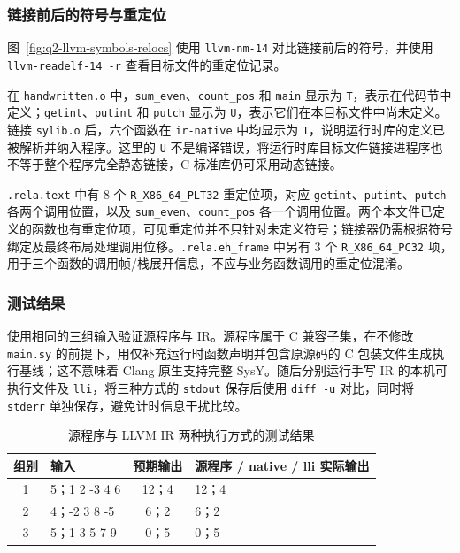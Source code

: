 
\subsubsection{链接前后的符号与重定位}

图~\ref{fig:q2-llvm-symbols-relocs} 使用 \texttt{llvm-nm-14} 对比链接前后的符号，并使用 \texttt{llvm-readelf-14 -r} 查看目标文件的重定位记录。


\begin{samepage}
在 \texttt{handwritten.o} 中，\texttt{sum\_even}、\texttt{count\_pos} 和 \texttt{main} 显示为 \texttt{T}，表示在代码节中定义；\texttt{getint}、\texttt{putint} 和 \texttt{putch} 显示为 \texttt{U}，表示它们在本目标文件中尚未定义。链接 \texttt{sylib.o} 后，六个函数在 \texttt{ir-native} 中均显示为 \texttt{T}，说明运行时库的定义已被解析并纳入程序。这里的 \texttt{U} 不是编译错误，将运行时库目标文件链接进程序也不等于整个程序完全静态链接，C 标准库仍可采用动态链接。
\end{samepage}

\texttt{.rela.text} 中有 8 个 \texttt{R\_X86\_64\_PLT32} 重定位项，对应 \texttt{getint}、\texttt{putint}、\texttt{putch} 各两个调用位置，以及 \texttt{sum\_even}、\texttt{count\_pos} 各一个调用位置。两个本文件已定义的函数也有重定位项，可见重定位并不只针对未定义符号；链接器仍需根据符号绑定及最终布局处理调用位移。\texttt{.rela.eh\_frame} 中另有 3 个 \texttt{R\_X86\_64\_PC32} 项，用于三个函数的调用帧/栈展开信息，不应与业务函数调用的重定位混淆。

\subsubsection{测试结果}

使用相同的三组输入验证源程序与 IR。源程序属于 C 兼容子集，在不修改 \texttt{main.sy} 的前提下，用仅补充运行时函数声明并包含原源码的 C 包装文件生成执行基线；这不意味着 Clang 原生支持完整 SysY。随后分别运行手写 IR 的本机可执行文件及 \texttt{lli}，将三种方式的 \texttt{stdout} 保存后使用 \texttt{diff -u} 对比，同时将 \texttt{stderr} 单独保存，避免计时信息干扰比较。

\begin{table}[H]
\centering

\begin{tabularx}{0.94\linewidth}{c X c X}
\toprule
组别 & 输入 & 预期输出 & 源程序 / native / lli 实际输出 \\
\midrule
1 & 5；1 2 -3 4 6 & 12；4 & 12；4 \\
2 & 4；-2 3 8 -5 & 6；2 & 6；2 \\
3 & 5；1 3 5 7 9 & 0；5 & 0；5 \\
\bottomrule
\end{tabularx}
\caption{源程序与 LLVM IR 两种执行方式的测试结果}
\label{tab:q2-llvm-tests}
\end{table}


